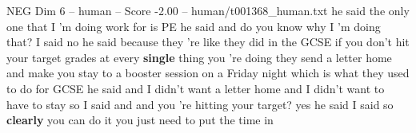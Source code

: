 \begin{textsample}{NEG Dim 6 – human – Score -2.00 – human/t001368\_human.txt}  \label{ex:f6_neg_037}
he said the only one that I 'm doing work for is PE he said and do you know why I 'm doing that?
I said no he said because they 're like they did in the GCSE if you don't hit your target grades at every \textbf{single} thing you 're doing they send a letter home and make you stay to a booster session on a Friday night which is what they used to do for GCSE he said and I didn't want a letter home and I didn't want to have to stay so I said and and you 're hitting your target? yes he said I said so \textbf{clearly} you can do it you just need to put the time in

\end{textsample}
